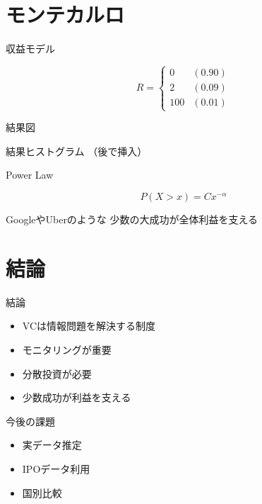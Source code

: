 \documentclass[aspectratio=169]{beamer}
\begin{document}
\section{モンテカルロ}

\begin{frame}{収益モデル}

\[
R=
\begin{cases}
0&(0.90)\\
2&(0.09)\\
100&(0.01)
\end{cases}
\]

\end{frame}








\begin{frame}{結果図}

結果ヒストグラム
（後で挿入）


\end{frame}

\begin{frame}{Power Law}

\[
P(X>x)
=
Cx^{-\alpha}
\]

GoogleやUberのような
少数の大成功が全体利益を支える

\end{frame}

\section{結論}

\begin{frame}{結論}

\begin{itemize}
\item VCは情報問題を解決する制度
\item モニタリングが重要
\item 分散投資が必要
\item 少数成功が利益を支える
\end{itemize}

\end{frame}

\begin{frame}{今後の課題}

\begin{itemize}
\item 実データ推定
\item IPOデータ利用
\item 国別比較
\end{itemize}

\end{frame}
\end{document}
